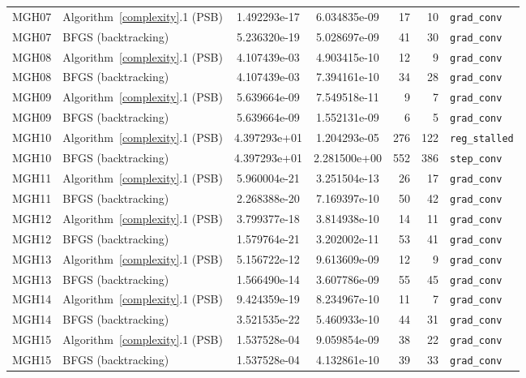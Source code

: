 \documentclass{article}
\begin{document}
{\begin{longtable}{l l S[table-format=1.3e2] S[table-format=1.3e2] r r >{\raggedright\arraybackslash}p{2.2cm}}
		\midrule
		MGH07 & Algorithm~\ref{complexity}.1 (PSB) & 1.492293e-17 & 6.034835e-09 & 17 & 10 & \texttt{grad\_conv} \\
		MGH07 & BFGS (backtracking) & 5.236320e-19 & 5.028697e-09 & 41 & 30 & \texttt{grad\_conv} \\
		\midrule
		MGH08 & Algorithm~\ref{complexity}.1 (PSB) & 4.107439e-03 & 4.903415e-10 & 12 & 9 & \texttt{grad\_conv} \\
		MGH08 & BFGS (backtracking) & 4.107439e-03 & 7.394161e-10 & 34 & 28 & \texttt{grad\_conv} \\
		\midrule
		MGH09 & Algorithm~\ref{complexity}.1 (PSB) & 5.639664e-09 & 7.549518e-11 & 9 & 7 & \texttt{grad\_conv} \\
		MGH09 & BFGS (backtracking) & 5.639664e-09 & 1.552131e-09 & 6 & 5 & \texttt{grad\_conv} \\
		\midrule
		MGH10 & Algorithm~\ref{complexity}.1 (PSB) & 4.397293e+01 & 1.204293e-05 & 276 & 122 & \texttt{reg\_stalled} \\
		MGH10 & BFGS (backtracking) & 4.397293e+01 & 2.281500e+00 & 552 & 386 & \texttt{step\_conv} \\
		\midrule
		MGH11 & Algorithm~\ref{complexity}.1 (PSB) & 5.960004e-21 & 3.251504e-13 & 26 & 17 & \texttt{grad\_conv} \\
		MGH11 & BFGS (backtracking) & 2.268388e-20 & 7.169397e-10 & 50 & 42 & \texttt{grad\_conv} \\
		\midrule
		MGH12 & Algorithm~\ref{complexity}.1 (PSB) & 3.799377e-18 & 3.814938e-10 & 14 & 11 & \texttt{grad\_conv} \\
		MGH12 & BFGS (backtracking) & 1.579764e-21 & 3.202002e-11 & 53 & 41 & \texttt{grad\_conv} \\
		\midrule
		MGH13 & Algorithm~\ref{complexity}.1 (PSB) & 5.156722e-12 & 9.613609e-09 & 12 & 9 & \texttt{grad\_conv} \\
		MGH13 & BFGS (backtracking) & 1.566490e-14 & 3.607786e-09 & 55 & 45 & \texttt{grad\_conv} \\
		\midrule
		MGH14 & Algorithm~\ref{complexity}.1 (PSB) & 9.424359e-19 & 8.234967e-10 & 11 & 7 & \texttt{grad\_conv} \\
		MGH14 & BFGS (backtracking) & 3.521535e-22 & 5.460933e-10 & 44 & 31 & \texttt{grad\_conv} \\
		\midrule
		MGH15 & Algorithm~\ref{complexity}.1 (PSB) & 1.537528e-04 & 9.059854e-09 & 38 & 22 & \texttt{grad\_conv} \\
		MGH15 & BFGS (backtracking) & 1.537528e-04 & 4.132861e-10 & 39 & 33 & \texttt{grad\_conv} \\

\end{longtable}}
\end{document}

